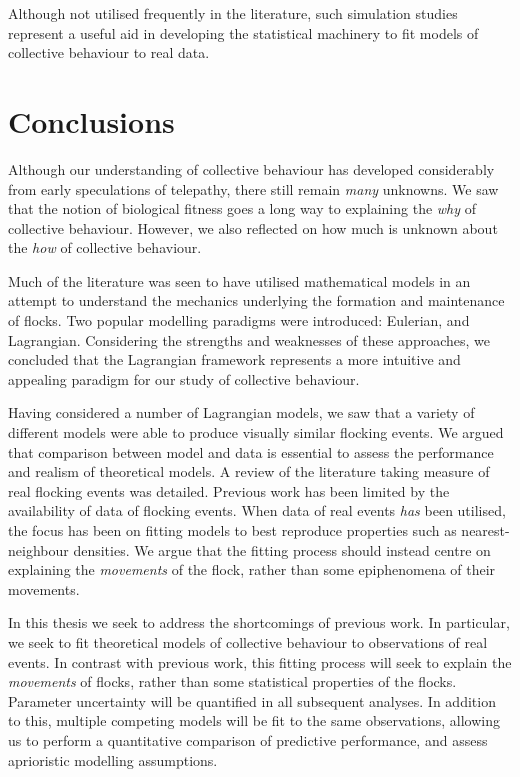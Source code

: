 Although not utilised frequently in the literature, such simulation studies
represent a useful aid in developing the statistical machinery to fit models of
collective behaviour to real data.

\section*{Conclusions}

Although our understanding of collective behaviour has developed considerably
from early speculations of telepathy, there still remain \emph{many} unknowns.
We saw that the notion of biological fitness goes a long way to explaining the
\emph{why} of collective behaviour. However, we also reflected on how much is
unknown about the \emph{how} of collective behaviour.

Much of the literature was seen to have utilised mathematical models in an
attempt to understand the mechanics underlying the formation and maintenance of
flocks. Two popular modelling paradigms were introduced: Eulerian, and
Lagrangian. Considering the strengths and weaknesses of these approaches, we
concluded that the Lagrangian framework represents a more intuitive and
appealing paradigm for our study of collective behaviour.

Having considered a number of Lagrangian models, we saw that a variety of
different models were able to produce visually similar flocking events. We
argued that comparison between model and data is essential to assess the
performance and realism of theoretical models. A review of the literature
taking measure of real flocking events was detailed. Previous work has been
limited by the availability of data of flocking events. When data of real
events \emph{has} been utilised, the focus has been on fitting models to best
reproduce properties such as nearest-neighbour densities. We argue that the
fitting process should instead centre on explaining the \emph{movements} of the
flock, rather than some epiphenomena of their movements.

In this thesis we seek to address the shortcomings of previous work. In
particular, we seek to fit theoretical models of collective behaviour to
observations of real events. In contrast with previous work, this fitting
process will seek to explain the \emph{movements} of flocks, rather than some
statistical properties of the flocks. Parameter uncertainty will be quantified
in all subsequent analyses. In addition to this, multiple competing models will
be fit to the same observations, allowing us to perform a quantitative
comparison of predictive performance, and assess aprioristic modelling
assumptions.

